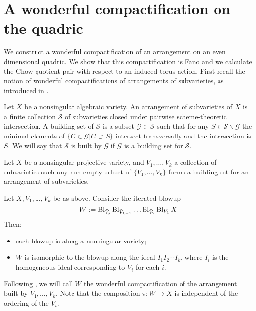 \section{A wonderful compactification on the quadric} \label{subsec:wonderful}
We construct a wonderful compactification of an arrangement on an even dimensional quadric. We show that this compactification is Fano and we calculate the Chow quotient pair with respect to an induced torus action. First recall the notion of wonderful compactifications of arrangements of subvarieties, as introduced in \cite{li06}.
\begin{definition}
Let \(X\) be a nonsingular algebraic variety. An arrangement of subvarieties of \(X\) is a finite collection \(\mathcal{S}\) of subvarieties closed under pairwise scheme-theoretic intersection. A building set of \(\mathcal{S}\) is a subset \(\mathcal{G} \subset \mathcal{S}\) such that for any \(S \in \mathcal{S} \backslash \mathcal{G}\) the minimal elements of \(\{G \in \mathcal{G} | G \supset S\}\) intersect transversally and the intersection is \(S\). We will say that \(\mathcal{S}\) is built by \(\mathcal{G}\) if \(\mathcal{G}\) is a building set for \(\mathcal{S}\).
\end{definition}
Let \(X\) be a nonsingular projective variety, and \(V_1,\dots,V_k\) a collection of subvarieties such any non-empty subset of \(\{V_1,\dots, V_k\}\) forms a building set for an arrangement of subvarieties.
\begin{theorem}[{\cite[Theorem 1.3]{li06}}] \label{thm:wonderful}
Let \(X,V_1,\dots,V_k\) be as above. Consider the iterated blowup
\[
W := \operatorname{Bl}_{\tilde{V}_k} \operatorname{Bl}_{\tilde{V}_{k-1}} \dots \operatorname{Bl}_{\tilde{V}_2} \operatorname{Bl}_{V_1} X
\]
Then:
\begin{itemize}
\item each blowup is along a nonsingular variety;
\item \(W\) is isomorphic to the blowup along the ideal \(I_1 I_2 \cdots I_k\), where \(I_i\) is the homogeneous ideal corresponding to \(V_i\) for each \(i\).
\end{itemize}
\end{theorem}
Following \cite{li06}, we will call \(W\) the wonderful compactification of the arrangement built by \(V_1,\dots,V_k\). Note that the composition \(\pi: W \to X\) is independent of the ordering of the \(V_i\).


